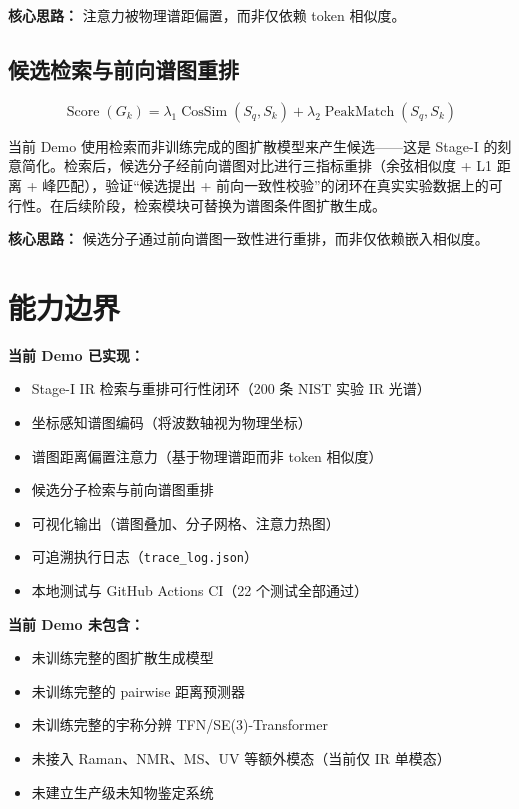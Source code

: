 \documentclass[11pt,a4paper]{ctexart}
\begin{document}
{\small\color{midblue}\textbf{核心思路：} 注意力被物理谱距偏置，而非仅依赖 token 相似度。}

\subsection{候选检索与前向谱图重排}

\begin{equation}\label{eq:score}
\operatorname{Score}(G_k) = \lambda_1 \operatorname{CosSim}(S_q, S_k) + \lambda_2 \operatorname{PeakMatch}(S_q, S_k)
\end{equation}

当前 Demo 使用检索而非训练完成的图扩散模型来产生候选——这是 Stage-I 的刻意简化。检索后，候选分子经前向谱图对比进行三指标重排（余弦相似度 + L1 距离 + 峰匹配），验证``候选提出 + 前向一致性校验''的闭环在真实实验数据上的可行性。在后续阶段，检索模块可替换为谱图条件图扩散生成。

{\small\color{midblue}\textbf{核心思路：} 候选分子通过前向谱图一致性进行重排，而非仅依赖嵌入相似度。}

\section{能力边界}

\begin{scopebox}
\small
\textbf{当前 Demo 已实现：}
\begin{itemize}
  \item Stage-I IR 检索与重排可行性闭环（200 条 NIST 实验 IR 光谱）
  \item 坐标感知谱图编码（将波数轴视为物理坐标）
  \item 谱图距离偏置注意力（基于物理谱距而非 token 相似度）
  \item 候选分子检索与前向谱图重排
  \item 可视化输出（谱图叠加、分子网格、注意力热图）
  \item 可追溯执行日志（\texttt{trace\_log.json}）
  \item 本地测试与 GitHub Actions CI（22 个测试全部通过）
\end{itemize}

\vspace{4pt}
\textbf{当前 Demo 未包含：}
\begin{itemize}
  \item 未训练完整的图扩散生成模型
  \item 未训练完整的 pairwise 距离预测器
  \item 未训练完整的宇称分辨 TFN/SE(3)-Transformer
  \item 未接入 Raman、NMR、MS、UV 等额外模态（当前仅 IR 单模态）
  \item 未建立生产级未知物鉴定系统
\end{itemize}
\end{scopebox}
\end{document}
